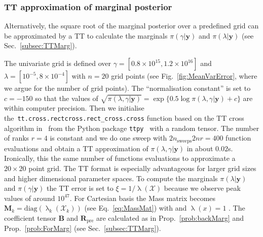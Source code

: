 \subsubsection{TT approximation of marginal posterior}
Alternatively, the square root of the marginal posterior over a predefined grid can be approximated by a TT to calculate the marginals $\pi(\gamma|\bm{y})$ and $\pi(\lambda|\bm{y})$ (see Sec.~\ref{subsec:TTMarg}).

The univariate grid is defined over $\gamma = [ 0.8 \times 10^{15},1.2 \times 10^{16}]$ and $\lambda = [ 10^{-5}, 8 \times 10^{-4}]$ with $n = 20$ grid points (see Fig.~\ref{fig:MeanVarError}, where we argue for the number of grid points).
The ``normalisation constant'' is set to $c=-150$ so that the values of $\sqrt{\pi( \lambda,\gamma| \bm{y})} = \exp \{ 0.5 \log  \pi(\lambda,\gamma | \bm{y}) + c \} $ are within computer precision.
Then we initialise \linebreak the~\texttt{tt.cross.rectcross.rect\_cross.cross} function based on the TT cross algorithm in~\cite{OSELEDETS2010TTCross,Dolgov2018TTCross} from the Python package \texttt{ttpy}~\cite{Oseledets2018ttpy} with a random tensor.
The number of ranks $r = 4$ is constant and we do one sweep with $2n_{\text{sweeps}}2nr =400$ function evaluations and obtain a TT approximation of $\pi( \lambda,\gamma| \bm{y})$ in about $0.02$s.
Ironically, this the same number of functions evaluations to approximate a $20 \times 20$ point grid.
The TT format is especially advantageous for larger grid sizes and higher dimensional parameter spaces.
To compute the marginals $\pi(\lambda| \bm{y})$ and $\pi(\gamma| \bm{y})$ the TT error is set to $\xi = 1 / \uplambda (\mathcal{X})$ because we observe peak values of around $10^{47}$.
For Cartesian basis the Mass matrix becomes $\bm{M}_k = \text{diag}(\uplambda_k(\mathcal{X}_k))$ (see Eq.~\ref{eq:MassMat}) with and $\uplambda(x) = 1$ .
The coefficient tensor $\bm{B}$ and $\bm{R}_{\text{pre}}$ are calculated as in Prop.~\ref{prob:backMarg} and Prop.~\ref{prob:ForMarg} (see Sec.~\ref{subsec:TTMarg}).

